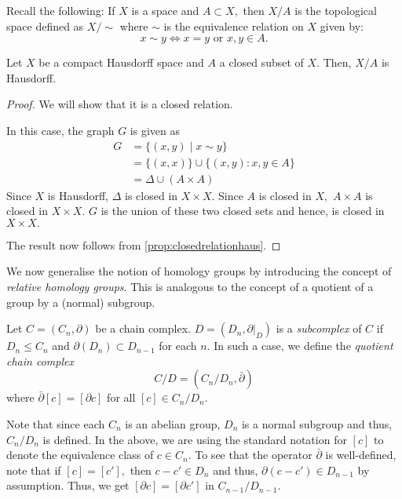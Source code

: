 \documentclass[12pt]{article}
\begin{document}
\begin{defn}
	Recall the following: If $X$ is a space and $A \subset X,$ then $X/A$ is the topological space defined as $X/{\sim}$ where $\sim$ is the equivalence relation on $X$ given by:
	\begin{equation*} 
		x \sim y \iff x = y \text{ or } x, y \in A.
	\end{equation*}
\end{defn}

\begin{cor} \label{cor:closedsubsetquotient}
	Let $X$ be a compact Hausdorff space and $A$ a closed subset of $X.$ Then, $X/A$ is Hausdorff.
\end{cor}
\begin{proof} 
	We will show that it is a closed relation.

	In this case, the graph $G$ is given as
	\begin{align*} 
		G &= \{(x, y) \mid x \sim y\}\\
		&= \{(x, x)\} \cup \{(x, y) : x, y \in A\}\\
		&= \Delta \cup (A \times A)
	\end{align*}
	Since $X$ is Hausdorff, $\Delta$ is closed in $X \times X.$ Since $A$ is closed in $X,$ $A \times A$ is closed in $X \times X.$ $G$ is the union of these two closed sets and hence, is closed in $X \times X.$

	The result now follows from \cref{prop:closedrelationhaus}.
\end{proof}

We now generalise the notion of homology groups by introducing the concept of \emph{relative homology groups}. This is analogous to the concept of a quotient of a group by a (normal) subgroup.

\begin{defn}
	Let $C = (C_n, \partial)$ be a chain complex. $D = (D_n, \partial|_{D})$ is a \emph{subcomplex} of $C$ if $D_n \le C_n$	and $\partial(D_n)\subset D_{n-1}$ for each $n.$ In such a case, we define the \emph{quotient chain complex}
	\begin{equation*} 
		C/D = (C_n/D_n, \bar{\partial})
	\end{equation*}
	where $\bar{\partial}[c] = [\partial c]$ for all $[c] \in C_n/D_n.$
\end{defn}
Note that since each $C_n$ is an abelian group, $D_n$ is a normal subgroup and thus, $C_n/D_n$ is defined. In the above, we are using the standard notation for $[c]$ to denote the equivalence class of $c \in C_n.$ To see that the operator $\bar{\partial}$ is well-defined, note that if $[c] = [c'],$ then $c - c' \in D_n$ and thus, $\partial(c - c') \in D_{n-1}$ by assumption. Thus, we get $[\partial c] = [\partial c']$ in $C_{n-1}/D_{n-1}.$
\end{document}
